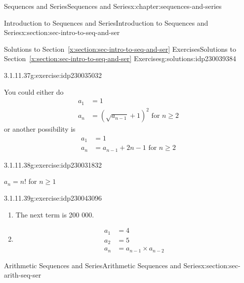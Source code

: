 \documentclass[twoside,10pt,]{book}
\newcommand{\xreffont}{\relax}
\numberwithin{equation}{section}
\newcommand{\amp}{&}
\begin{document}
\begin{chapterptx}{Sequences and Series}{}{Sequences and Series}{}{}{x:chapter:sequences-and-series}
\begin{sectionptx}{Introduction to Sequences and Series}{}{Introduction to Sequences and Series}{}{}{x:section:sec-intro-to-seq-and-ser}
\begin{solutions-subsection}{Solutions to Section~{\xreffont\ref*{x:section:sec-intro-to-seq-and-ser}} Exercises}{}{Solutions to Section~{\xreffont\ref*{x:section:sec-intro-to-seq-and-ser}} Exercises}{}{}{g:solutions:idp230039384}
\begin{exercisegroup}
\end{exercisegroup}
\par\medskip\noindent
\begin{exercisegroup}
\begin{divisionsolutioneg}{3.1.11.37}{}{g:exercise:idp230035032}%
\par\smallskip%
\noindent\hypertarget{g:solution:idp230036440-main}{}You could either do%
\begin{align*}
a_1 \amp = 1\\
a_n \amp = \left( \sqrt{a_{n - 1}}  + 1 \right)^2 \text{   for } n \ge 2
\end{align*}
or another possibility is%
\begin{align*}
a_1 \amp = 1\\
a_n \amp = a_{n - 1} + 2n - 1 \text{   for } n \ge 2
\end{align*}
\end{divisionsolutioneg}%
\begin{divisionsolutioneg}{3.1.11.38}{}{g:exercise:idp230031832}%
\par\smallskip%
\noindent\hypertarget{g:solution:idp230040408-main}{}\({a_n} = n!\) for \(n \ge 1\)\end{divisionsolutioneg}%
\begin{divisionsolutioneg}{3.1.11.39}{}{g:exercise:idp230043096}%
\par\smallskip%
\noindent\hypertarget{g:solution:idp230044376-main}{}%
\begin{enumerate}[label=(\alph*)]
\item{}The next term is 200 000.%
\item{}%
\begin{align*}
a_1 \amp = 4\\
a_2 \amp = 5\\
a_n \amp = a_{n - 1} \times a_{n - 2}
\end{align*}
%
\end{enumerate}
\end{divisionsolutioneg}%
\end{exercisegroup}
\par\medskip\noindent
\end{solutions-subsection}
\end{sectionptx}
%
%
\typeout{************************************************}
\typeout{************************************************}
%
\begin{sectionptx}{Arithmetic Sequences and Series}{}{Arithmetic Sequences and Series}{}{}{x:section:sec-arith-seq-ser}

\end{sectionptx}
\end{chapterptx}
\end{document}

